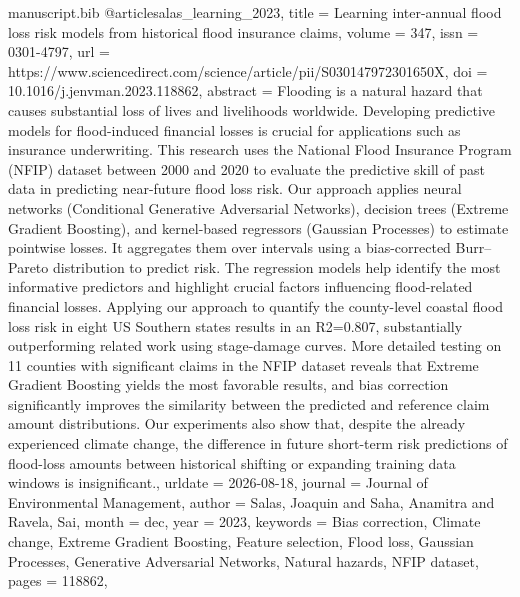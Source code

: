 \begin{filecontents*}[force]{manuscript.bib}
@article{salas_learning_2023,
	title = {Learning inter-annual flood loss risk models from historical flood insurance claims},
	volume = {347},
	issn = {0301-4797},
	url = {https://www.sciencedirect.com/science/article/pii/S030147972301650X},
	doi = {10.1016/j.jenvman.2023.118862},
	abstract = {Flooding is a natural hazard that causes substantial loss of lives and livelihoods worldwide. Developing predictive models for flood-induced financial losses is crucial for applications such as insurance underwriting. This research uses the National Flood Insurance Program (NFIP) dataset between 2000 and 2020 to evaluate the predictive skill of past data in predicting near-future flood loss risk. Our approach applies neural networks (Conditional Generative Adversarial Networks), decision trees (Extreme Gradient Boosting), and kernel-based regressors (Gaussian Processes) to estimate pointwise losses. It aggregates them over intervals using a bias-corrected Burr–Pareto distribution to predict risk. The regression models help identify the most informative predictors and highlight crucial factors influencing flood-related financial losses. Applying our approach to quantify the county-level coastal flood loss risk in eight US Southern states results in an R2=0.807, substantially outperforming related work using stage-damage curves. More detailed testing on 11 counties with significant claims in the NFIP dataset reveals that Extreme Gradient Boosting yields the most favorable results, and bias correction significantly improves the similarity between the predicted and reference claim amount distributions. Our experiments also show that, despite the already experienced climate change, the difference in future short-term risk predictions of flood-loss amounts between historical shifting or expanding training data windows is insignificant.},
	urldate = {2026-08-18},
	journal = {Journal of Environmental Management},
	author = {Salas, Joaquin and Saha, Anamitra and Ravela, Sai},
	month = dec,
	year = {2023},
	keywords = {Bias correction, Climate change, Extreme Gradient Boosting, Feature selection, Flood loss, Gaussian Processes, Generative Adversarial Networks, Natural hazards, NFIP dataset},
	pages = {118862},
}



\end{filecontents*}
